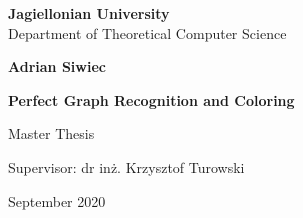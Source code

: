 \begin{titlepage}
	\begin{center}
        
		\large
		\textbf{Jagiellonian University}\\
		Department of Theoretical Computer Science\\

		\vspace{1.5cm}

		\Large
		\textbf{Adrian Siwiec}

		\vspace*{2cm}

		\textbf{\LARGE Perfect Graph Recognition and Coloring}
		
		\vspace{0.5cm}
		\large
		
		\vfill
		\Large
		Master Thesis

		\vfill
		\Large
		Supervisor: dr in\.z. Krzysztof Turowski
		
		\vspace{0.8cm}
		
		September 2020
		
\end{center}
\end{titlepage}